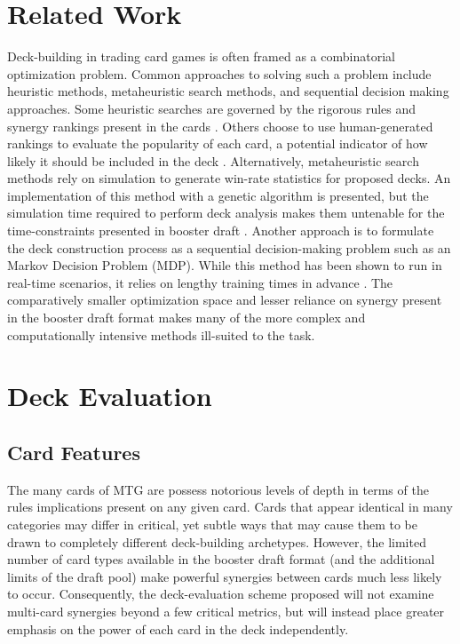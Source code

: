 \documentclass[letterpaper]{article} %
\begin{document}
\section{Related Work}

Deck-building in trading card games is often framed as a combinatorial optimization problem. Common approaches to solving such a problem include heuristic methods, metaheuristic search methods, and sequential decision making approaches. Some heuristic searches are governed by the rigorous rules and synergy rankings present in the cards \cite{stiegler16}. Others choose to use human-generated rankings to evaluate the popularity of each card, a potential indicator of how likely it should be included in the deck \cite{karsten17}. Alternatively, metaheuristic search methods rely on simulation to generate win-rate statistics for proposed decks. An implementation of this method with a genetic algorithm is presented, but the simulation time required to perform deck analysis makes them untenable for the time-constraints presented in booster draft \cite{merelo16}. Another approach is to formulate the deck construction process as a sequential decision-making problem such as an Markov Decision Problem (MDP). While this method has been shown to run in real-time scenarios, it relies on lengthy training times in advance \cite{el-nasr18}. The comparatively smaller optimization space and lesser reliance on synergy present in the booster draft format makes many of the more complex and computationally intensive methods ill-suited to the task.

\section{Deck Evaluation}

\subsection{Card Features}

The many cards of MTG are possess notorious levels of depth in terms of the rules implications present on any given card. Cards that appear identical in many categories may differ in critical, yet subtle ways that may cause them to be drawn to completely different deck-building archetypes. However, the limited number of card types available in the booster draft format (and the additional limits of the draft pool) make powerful synergies between cards much less likely to occur. Consequently, the deck-evaluation scheme proposed will not examine multi-card synergies beyond a few critical metrics, but will instead place greater emphasis on the power of each card in the deck independently.
\end{document}
